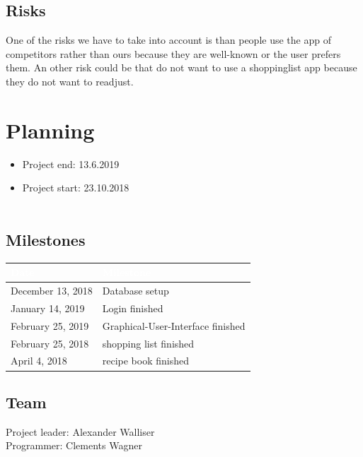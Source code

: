 \documentclass[12pt]{article}
\theoremstyle{definition}
\begin{document}
\subsection{Risks}
One of the risks we have to take into account is than people use the app of competitors rather than ours because they are well-known or the user prefers them. An other risk could be that do not want to use a shoppinglist app because they do not want to readjust.

\pagebreak

\section{Planning}

\begin{itemize}
\item Project end: 13.6.2019
\item Project start: 23.10.2018 \\\\
\end{itemize}

\subsection{Milestones}
\begin{tabular}{|l|l|}
\hline
\cellcolor[gray]{0.5}\textcolor{white}{Date} &
\cellcolor[gray]{0.5}\textcolor{white}{Milestone} \\ \hline
December 13, 2018 & Database setup \\ \hline
January 14, 2019 & Login finished \\ \hline
February 25, 2019 & Graphical-User-Interface finished \\ \hline
February 25, 2018 & shopping list finished \\ \hline
April 4, 2018 & recipe book finished \\ \hline
\end{tabular}

\subsection{Team}
Project leader: Alexander Walliser \\
Programmer: Clements Wagner
\end{document}
